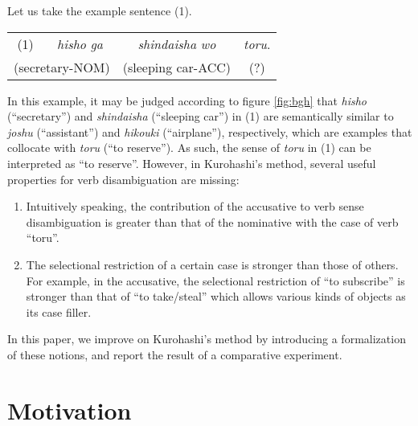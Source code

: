 Let us take the example sentence (1).
\begin{list}{}{\setlength{\leftmargin}{0mm}}
\item
  \begin{tabular}{cccc}
    (1) & {\it hisho\/} {\it ga\/} & {\it shindaisha\/} {\it wo\/} &
    {\it toru}. \\ \multicolumn{2}{c}{(secretary-NOM)} & (sleeping
    car-ACC) & (?)
  \end{tabular}
\end{list}
In this example, it may be judged according to figure \ref{fig:bgh}
that {\it hisho\/} (``secretary'') and {\it shindaisha\/} (``sleeping
car'') in (1) are semantically similar to {\it joshu\/}
(``assistant'') and {\it hikouki\/} (``airplane''), respectively,
which are examples that collocate with {\it toru\/} (``to reserve'').
As such, the sense of {\it toru\/} in (1) can be interpreted as ``to
reserve''.  However, in Kurohashi's method, several useful properties
for verb disambiguation are missing:
\begin{enumerate}
\item Intuitively speaking, the contribution of the accusative to verb
  sense disambiguation is greater than that of the nominative with the
  case of verb ``toru''.
\item The selectional restriction of a certain case is stronger than
  those of others. For example, in the accusative, the selectional
  restriction of ``to subscribe'' is stronger than that of ``to
  take/steal'' which allows various kinds of objects as its case
  filler.
\end{enumerate}
In this paper, we improve on Kurohashi's method by introducing a
formalization of these notions, and report the result of a comparative
experiment.

\section{Motivation}
\label{sec:motivation}

